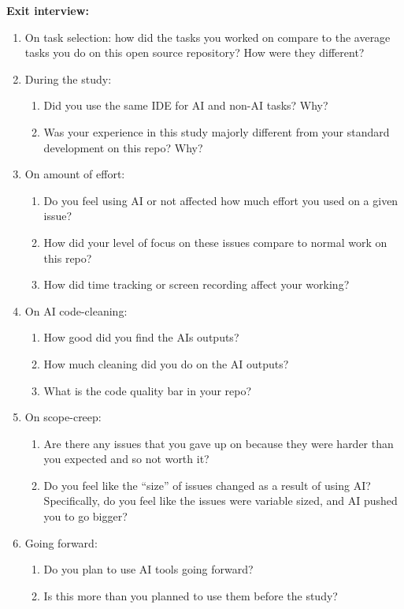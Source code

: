 \documentclass{article}
\begin{document}
\begin{instructionbox}
\textbf{Exit interview:}
\begin{enumerate}
    \item On task selection: how did the tasks you worked on compare to the average tasks you do on this open source repository? How were they different?
    \item During the study:
    \begin{enumerate}
        \item Did you use the same IDE for AI and non-AI tasks? Why?
        \item Was your experience in this study majorly different from your standard development on this repo? Why?
    \end{enumerate}
    \item On amount of effort:
    \begin{enumerate}
        \item Do you feel using AI or not affected how much effort you used on a given issue?
        \item How did your level of focus on these issues compare to normal work on this repo?
        \item How did time tracking or screen recording affect your working?
    \end{enumerate}
    \item On AI code-cleaning:
    \begin{enumerate}
        \item How good did you find the AIs outputs?
        \item How much cleaning did you do on the AI outputs?
        \item What is the code quality bar in your repo?
    \end{enumerate}
    \item On scope-creep:
    \begin{enumerate}
        \item Are there any issues that you gave up on because they were harder than you expected and so not worth it?
        \item Do you feel like the “size” of issues changed as a result of using AI? Specifically, do you feel like the issues were variable sized, and AI pushed you to go bigger?
    \end{enumerate}
    \item Going forward:
    \begin{enumerate}
        \item Do you plan to use AI tools going forward?
        \item Is this more than you planned to use them before the study?

\end{enumerate}
\end{enumerate}
\end{instructionbox}
\end{document}
